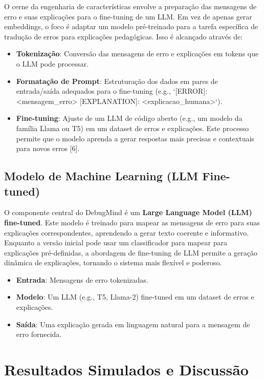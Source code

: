 \documentclass{article}
\begin{document}
O cerne da engenharia de características envolve a preparação das mensagens de erro e suas explicações para o fine-tuning de um LLM. Em vez de apenas gerar embeddings, o foco é adaptar um modelo pré-treinado para a tarefa específica de tradução de erros para explicações pedagógicas. Isso é alcançado através de:
\begin{itemize}
    \item \textbf{Tokenização}: Conversão das mensagens de erro e explicações em tokens que o LLM pode processar.
    \item \textbf{Formatação de Prompt}: Estruturação dos dados em pares de entrada/saída adequados para o fine-tuning (e.g., `[ERROR]: <mensagem_erro> [EXPLANATION]: <explicacao_humana>`).
    \item \textbf{Fine-tuning}: Ajuste de um LLM de código aberto (e.g., um modelo da família Llama ou T5) em um dataset de erros e explicações. Este processo permite que o modelo aprenda a gerar respostas mais precisas e contextuais para novos erros [6].
\end{itemize}

\subsection{Modelo de Machine Learning (LLM Fine-tuned)}

O componente central do DebugMind é um \textbf{Large Language Model (LLM) fine-tuned}. Este modelo é treinado para mapear as mensagens de erro para suas explicações correspondentes, aprendendo a gerar texto coerente e informativo. Enquanto a versão inicial pode usar um classificador para mapear para explicações pré-definidas, a abordagem de fine-tuning de LLM permite a geração dinâmica de explicações, tornando o sistema mais flexível e poderoso.

\begin{itemize}
    \item \textbf{Entrada}: Mensagens de erro tokenizadas.
    \item \textbf{Modelo}: Um LLM (e.g., T5, Llama-2) fine-tuned em um dataset de erros e explicações.
    \item \textbf{Saída}: Uma explicação gerada em linguagem natural para a mensagem de erro fornecida.
\end{itemize}

\section{Resultados Simulados e Discussão}
\end{document}
